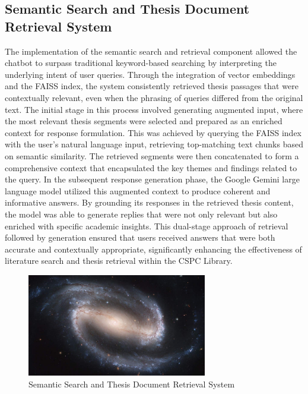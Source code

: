 \begin{refsection}
\section{Semantic Search and Thesis Document Retrieval System}
The implementation of the semantic search and retrieval component allowed the chatbot to surpass traditional keyword-based searching by interpreting the underlying intent of user queries. Through the integration of vector embeddings and the FAISS index, the system consistently retrieved thesis passages that were contextually relevant, even when the phrasing of queries differed from the original text. The initial stage in this process involved generating augmented input, where the most relevant thesis segments were selected and prepared as an enriched context for response formulation.
This was achieved by querying the FAISS index with the user’s natural language input, retrieving top-matching text chunks based on semantic similarity. The retrieved segments were then concatenated to form a comprehensive context that encapsulated the key themes and findings related to the query. In the subsequent response generation phase, the Google Gemini large language model utilized this augmented context to produce coherent and informative answers. By grounding its responses in the retrieved thesis content, the model was able to generate replies that were not only relevant but also enriched with specific academic insights. This dual-stage approach of retrieval followed by generation ensured that users received answers that were both accurate and contextually appropriate, significantly enhancing the effectiveness of literature search and thesis retrieval within the CSPC Library.
\begin{figure}[h]
    \centering
    \includegraphics[width=0.7\textwidth]{figures/sampleFig1.jpg}
    \caption{Semantic Search and Thesis Document Retrieval System}
\end{figure}


\end{refsection}
